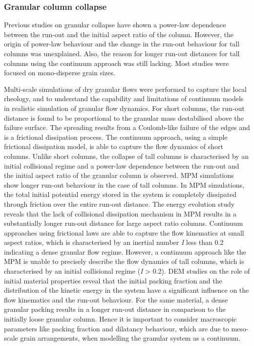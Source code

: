 \subsubsection*{Granular column collapse}

Previous studies on granular collapse have shown a power-law dependence between 
the run-out and the initial aspect ratio of the column. However, the origin of 
power-law behaviour and the change in the run-out behaviour for tall columns 
was unexplained. Also, the reason for longer run-out distances for 
tall columns using the continuum approach was still lacking. Most studies
were focused on mono-disperse grain sizes. 

Multi-scale simulations of dry granular flows were performed to capture the 
local rheology, and to understand the capability and limitations of continuum 
models in realistic simulation of granular flow dynamics. For short columns, 
the run-out distance is found to be proportional to the granular mass 
destabilised above the failure surface. The spreading results from a 
Coulomb-like failure of the edges and is a frictional dissipation process. The 
continuum approach, using a simple frictional dissipation model, is able to 
capture the flow dynamics of short columns. Unlike short columns, the collapse 
of tall columns is characterised by an initial collisional regime and a 
power-law dependence between the run-out and the initial aspect ratio of the 
granular column is observed. MPM simulations show longer run-out behaviour in 
the case of tall columns. In MPM simulations, the total initial 
potential energy stored in the system is completely dissipated through friction 
over the entire run-out distance. The energy evolution study reveals that the 
lack of collisional dissipation mechanism in MPM results in a substantially 
longer run-out distance for large aspect ratio columns. Continuum 
approaches using frictional laws are able to capture the flow kinematics at 
small aspect ratios, which is characterised by an inertial 
number \textit{I} less than 0.2 indicating a dense granular flow regime. 
However, a continuum approach like the MPM is unable to precisely describe the 
flow dynamics of tall columns, which is characterised by an initial collisional 
regime (\textit{I} > 0.2). DEM studies on the role of initial material 
properties reveal that the initial packing fraction and the distribution of the 
kinetic energy in the system have a significant influence on the flow 
kinematics and the run-out behaviour. For the same material, a dense granular 
packing results in a longer run-out distance in comparison to the initially 
loose granular column. Hence it is important to consider macroscopic parameters 
like packing fraction and dilatancy behaviour, which are due to meso-scale 
grain arrangements, when modelling the granular system as a continuum.

